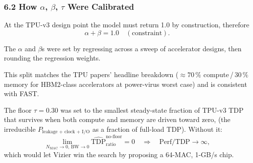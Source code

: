 \documentclass[11pt,a4paper]{article}
\begin{document}
\subsubsection*{6.2 How $\alpha$, $\beta$, $\tau$ Were Calibrated}

At the TPU-v3 design point the model must return 1.0 by construction, therefore
\[
\alpha + \beta = 1.0 \quad (\text{constraint}).
\]

The $\alpha$ and $\beta$s were set by regressing across a sweep of
accelerator designs, then rounding the regression weights.


This split matches the TPU papers' headline breakdown ($\approx 70\,\%$
compute\,/\,$30\,\%$ memory for HBM2-class accelerators at power-virus worst
case) and is consistent with FAST.

The floor $\tau = 0.30$ was set to the smallest steady-state fraction of
TPU-v3 TDP that survives when both compute and memory are driven toward zero,
(the irreducible $P_{\text{leakage + clock + I/O}}$ as a fraction of
full-load TDP). Without it:
\[
\lim_{N_{\text{MAC}}\to 0,\, \text{BW}\to 0}
\widehat{\text{TDP}}_{\text{ratio}}^{\text{no-floor}} = 0
\quad\Rightarrow\quad
\text{Perf/TDP} \to \infty,
\]
which would let Vizier win the search by proposing a 64-MAC, 1-GB/s chip.


\end{document}
